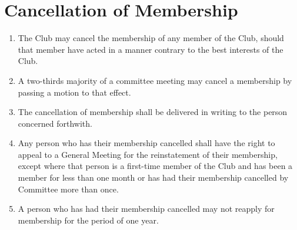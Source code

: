 \documentclass[11pt]{article} %
\begin{document}
\section{Cancellation of Membership}
\begin{enumerate}
\item The Club may cancel the membership of any member of the Club, should that member have acted in a manner contrary to the best interests of the Club.
\item A two-thirds majority of a committee meeting may cancel a membership by passing a motion to that effect.
\item The cancellation of membership shall be delivered in writing to the person concerned forthwith.
\item Any person who has their membership cancelled shall have the right to appeal to a General Meeting for the reinstatement of their membership, except where that person is a first-time member of the Club and has been a member for less than one month or has had their membership cancelled by Committee more than once.
\item A person who has had their membership cancelled may not reapply for membership for the period of one year.
\end{enumerate}
\end{document}
